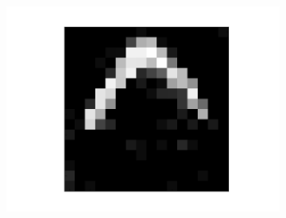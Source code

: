 \begin{figure}[h!]
\begin{subfigure}{.25\textwidth}
  		\label{fig:sub1}
	\end{subfigure}%
	\begin{subfigure}{.25\textwidth}
  		\centering
  		\includegraphics[width=.6\linewidth]{imgs/poker/compl41.png}
  		\label{fig:sub1}
	\end{subfigure}%
	

\end{figure}
